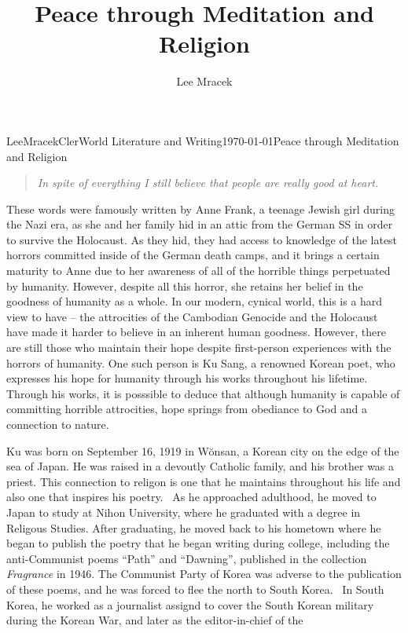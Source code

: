 \documentclass[12pt,letterpaper]{article}
\begin{document}
\title{Peace through Meditation and Religion}
\author{Lee Mracek}
\maketitle
\pagebreak
\tableofcontents
\pagebreak
{}
\begin{mla}{Lee}{Mracek}{Cler}{World Literature and Writing}{\today}{Peace through Meditation and Religion}
\begin{quote}\textit{In spite of everything I still believe that people are really good at heart.}\end{quote} 
\qquad These words were famously written by Anne Frank, a teenage Jewish girl during the Nazi era, as she and her family hid in an attic from the German SS in order to survive the Holocaust. As they hid, they had access to knowledge of the latest horrors committed inside of the German death camps, and it brings a certain maturity to Anne due to her awareness of all of the horrible things perpetuated by humanity. However, despite all this horror, she retains her belief in the goodness
    of humanity as a whole. In our modern, cynical world, this is a hard view to have -- the attrocities of the Cambodian Genocide and the Holocaust have made it harder to believe in an inherent human goodness. However, there are still those who maintain their hope despite first-person experiences with the horrors of humanity. One such person is Ku Sang, a renowned Korean poet, who expresses his hope for humanity through his works throughout his lifetime. Through his works, it is
    posssible to deduce that although humanity is capable of committing horrible attrocities, hope springs from obediance to God and a connection to nature.\\
    Ku was born on September 16, 1919 in W\u{o}nsan, a Korean city on the edge of the sea of Japan. He was raised in a devoutly Catholic family, and his brother was a priest. This connection to religon is one that he maintains throughout his life and also one that inspires his poetry.~\parencite{bong-goon} As he approached adulthood, he moved to Japan to study at Nihon University, where he graduated with a degree in Religous Studies. After graduating, he moved back to his hometown
    where he began to publish the poetry that he began writing during college, including the anti-Communist poems ``Path'' and ``Dawning'', published in the collection \textit{Fragrance} in 1946. The Communist Party of Korea was adverse to the publication of these poems, and he was forced to flee the north to South Korea.~\parencite{lti} In South Korea, he worked as a journalist assignd to cover the South Korean military during the Korean War, and later as the editor-in-chief of the

\end{mla}
\end{document}
